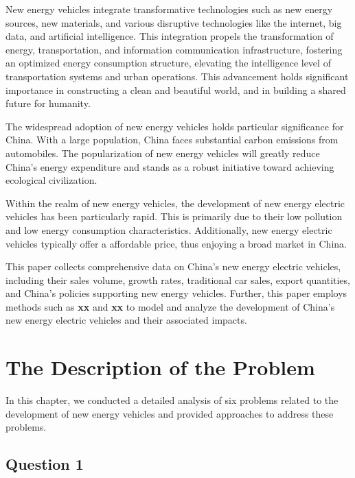 \documentclass{apmcmthesis}
\begin{document}



New energy vehicles integrate transformative technologies such as new energy sources, new materials, and various disruptive technologies like the internet, big data, and artificial intelligence. This integration propels the transformation of energy, transportation, and information communication infrastructure, fostering an optimized energy consumption structure, elevating the intelligence level of transportation systems and urban operations. This advancement holds significant importance in constructing a clean and beautiful world, and in building a shared future for humanity.

The widespread adoption of new energy vehicles holds particular significance for China. With a large population, China faces substantial carbon emissions from automobiles. The popularization of new energy vehicles will greatly reduce China's energy expenditure and stands as a robust initiative toward achieving ecological civilization.

Within the realm of new energy vehicles, the development of new energy electric vehicles has been particularly rapid. This is primarily due to their low pollution and low energy consumption characteristics. Additionally, new energy electric vehicles typically offer a affordable price, thus enjoying a broad market in China.

This paper collects comprehensive data on China's new energy electric vehicles, including their sales volume, growth rates, traditional car sales, export quantities, and China's policies supporting new energy vehicles. Further, this paper employs methods such as \textbf{xx} and \textbf{xx} to model and analyze the development of China's new energy electric vehicles and their associated impacts.


\section{The Description of the Problem}

In this chapter, we conducted a detailed analysis of six problems related to the development of new energy vehicles and provided approaches to address these problems.

\subsection{Question 1}
\end{document}
